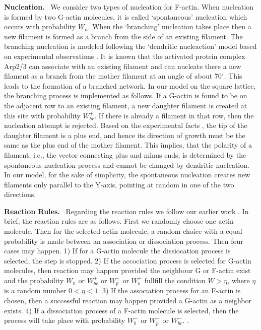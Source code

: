 \documentclass[aps,preprint,pre,array,epsfig,eqsecnum]{revtex4}
\begin{document}
\vskip0.2cm\noindent
{\bf Nucleation.}~
We consider two types of nucleation for F-actin.
When nucleation is formed by two G-actin molecules,  it is called `spontaneous' 
nucleation which occurs with probability $W_n$. When
the `branching' nucleation takes place then a new filament is formed
as a branch from the side of an existing filament.
The branching nucleation is modeled
following the `dendritic nucleaction' model based on experimental observations
\cite{Borisy99b,Pollard01,Pollard02}.
It is known 
that the activated protein complex Arp2/3 
can associate with an existing
filament and can  nucleate there a new filament
as a branch from the mother filament at an angle of about 70$^{\circ}$. 
This leads to the formation of a branched network. 
In our model on the square lattice, the branching process is implemented
as follows. 
If a G-actin is found to be on the adjacent row to an 
existing filament, a new daughter 
filament is created at this site with probability $W^{+}_{br}$. 
If there 
is already a filament in that row, then the nucleation attempt is rejected.
Based on the experimental facts \cite{Borisy99b,Pollard01,Pollard02}, the
tip of the daughter filament is a plus end, 
and hence its
direction of growth must be the same as the plus end of the
mother filament.
This implies, that the polarity of a filament, i.e., the vector connecting
plus and minus ends, is determined by the spontaneous nucleation
process and cannot be changed by dendritic nucleation.
In our model,
for the sake of simplicity, the spontaneous nucleation creates
new filaments only parallel to the Y-axis, pointing at random in
one of the two directions.


\vskip0.2cm\noindent
{\bf Reaction Rules.}~
Regarding the reaction rules we follow our earlier work \cite{Satya04}. In brief, 
the reaction rules are as follows. First we randomly choose one actin 
molecule. Then for the selected actin molecule, a random choice with 
a equal probability is made between an association or dissociation 
process. Then four cases may happen.
1) If  for a G-actin molecule the dissiocation process is selected, the step is 
stopped.
2) If the accociation process is selected for G-actin molecules, then reaction 
may happen provided the neighbour G or F-actin exist and the 
probability $W_n$ or $W^{+}_{br}$  or $W^{+}_p$ or $W^{+}_b$  fullfill the 
condition $W > \eta$, where $\eta$ is a random number $0 < \eta < 1$.
3) If the association process for an F-actin is chosen, then a successful 
reaction may happen provided a G-actin as a neighbor exists. 
4) If a dissociation process of a F-actin molecule is selected, then the 
process will take place with probability $W^{-}_b$ or $W^{-}_p$ or $W^{-}_{br}$.  .
\end{document}
